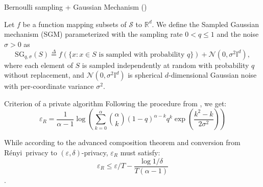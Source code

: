 \documentclass{beamer}
\newcommand{\eqdef}{\stackrel{\Delta}{=}}
\newcommand{\SG}{\mathrm{SG}}
\newcommand{\renyi}{R\'enyi}
\newcommand{\eps}{\varepsilon}
\begin{document}
\begin{frame}{Bernoulli sampling + Gaussian Mechanism (\cite{mironov2019SGM})}
    \begin{definition} Let $f$ be a function mapping subsets of $\mathcal{S}$ to $\mathbb{R}^d$. We define the Sampled Gaussian mechanism (SGM) parameterized with the sampling rate $0<q\leq 1$ and the noise $\sigma>0$ as
        \[
        \SG_{q,\sigma}(S)\eqdef f(\{x\colon x\in S \textrm{ is sampled with probability } q\})+\mathcal{N}(0,\sigma^2\mathbb{I}^d),
        \]
    where each element of $S$ is sampled independently at random with probability $q$ without replacement, and $\mathcal{N}(0,\sigma^2\mathbb{I}^d)$ is spherical $d$-dimensional Gaussian noise with per-coordinate variance $\sigma^2$.
    \end{definition}
    
    \end{frame}
\begin{frame}{Criterion of a private algorithm}
Following the procedure from \cite{mironov2019SGM}, we get:
$$\eps_R = \frac{1}{\alpha - 1} \log\left(\sum_{k=0}^{\alpha} {\alpha \choose k}  (1-q)^{\alpha-k}q^{k} \exp\left(\frac{k^2 - k}{2\sigma^2}\right)\right)$$

While according to the advanced composition theorem and conversion from \renyi\ privacy to $(\eps, \delta)$-privacy, $\eps_R$ must satisfy:
$$ \eps_R \leq \eps/T - \frac{\log 1/\delta}{T(\alpha - 1)}$$.
\end{frame}
\end{document}
